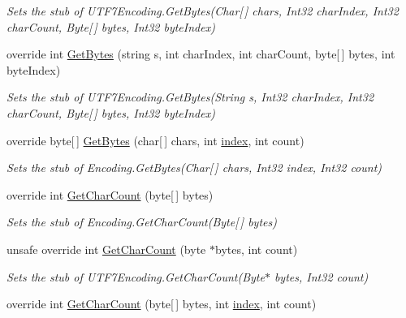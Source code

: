 \begin{DoxyCompactItemize}
\begin{DoxyCompactList}\small\item\em Sets the stub of U\-T\-F7\-Encoding.\-Get\-Bytes(\-Char\mbox{[}$\,$\mbox{]} chars, Int32 char\-Index, Int32 char\-Count, Byte\mbox{[}$\,$\mbox{]} bytes, Int32 byte\-Index)\end{DoxyCompactList}\item 
override int \hyperlink{class_system_1_1_text_1_1_fakes_1_1_stub_u_t_f7_encoding_acc950df3788700848d11e82a6436b4a7}{Get\-Bytes} (string s, int char\-Index, int char\-Count, byte\mbox{[}$\,$\mbox{]} bytes, int byte\-Index)
\begin{DoxyCompactList}\small\item\em Sets the stub of U\-T\-F7\-Encoding.\-Get\-Bytes(\-String s, Int32 char\-Index, Int32 char\-Count, Byte\mbox{[}$\,$\mbox{]} bytes, Int32 byte\-Index)\end{DoxyCompactList}\item 
override byte\mbox{[}$\,$\mbox{]} \hyperlink{class_system_1_1_text_1_1_fakes_1_1_stub_u_t_f7_encoding_a3965350f5a5c673b5a9ac36f2291ca94}{Get\-Bytes} (char\mbox{[}$\,$\mbox{]} chars, int \hyperlink{jquery-1_810_82-vsdoc_8js_a75bb12d1f23302a9eea93a6d89d0193e}{index}, int count)
\begin{DoxyCompactList}\small\item\em Sets the stub of Encoding.\-Get\-Bytes(\-Char\mbox{[}$\,$\mbox{]} chars, Int32 index, Int32 count)\end{DoxyCompactList}\item 
override int \hyperlink{class_system_1_1_text_1_1_fakes_1_1_stub_u_t_f7_encoding_ae07d56ad9d1e9acb019390d696cbdb3b}{Get\-Char\-Count} (byte\mbox{[}$\,$\mbox{]} bytes)
\begin{DoxyCompactList}\small\item\em Sets the stub of Encoding.\-Get\-Char\-Count(\-Byte\mbox{[}$\,$\mbox{]} bytes)\end{DoxyCompactList}\item 
unsafe override int \hyperlink{class_system_1_1_text_1_1_fakes_1_1_stub_u_t_f7_encoding_aef67f1583f0f27565386f5df4761a50d}{Get\-Char\-Count} (byte $\ast$bytes, int count)
\begin{DoxyCompactList}\small\item\em Sets the stub of U\-T\-F7\-Encoding.\-Get\-Char\-Count(\-Byte$\ast$ bytes, Int32 count)\end{DoxyCompactList}\item 
override int \hyperlink{class_system_1_1_text_1_1_fakes_1_1_stub_u_t_f7_encoding_afae8e67bd6fcd3aba9442f687e8f3c75}{Get\-Char\-Count} (byte\mbox{[}$\,$\mbox{]} bytes, int \hyperlink{jquery-1_810_82-vsdoc_8js_a75bb12d1f23302a9eea93a6d89d0193e}{index}, int count)

\end{DoxyCompactItemize}
